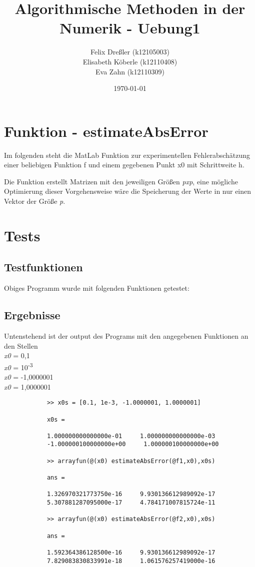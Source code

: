 \documentclass[11pt,titlepage]{article}
\title{Algorithmische Methoden in der Numerik - Uebung1}
\author{Felix Dreßler (k12105003) \\ Elisabeth Köberle (k12110408) \\ Eva Zahn (k12110309)}
\date{\today} %
\begin{document}
\maketitle

\section{Funktion - estimateAbsError}

Im folgenden steht die MatLab Funktion zur experimentellen Fehlerabschätzung einer beliebigen Funktion f und einem gegebenen Punkt x0 mit Schrittweite h.

Die Funktion erstellt Matrizen mit den jeweiligen Größen \emph{pxp}, eine mögliche Optimierung dieser Vorgehensweise wäre die Speicherung der Werte in nur einen Vektor der Größe \emph{p}.   

	
		
\section{Tests}
	\subsection{Testfunktionen}
		Obiges Programm wurde mit folgenden Funktionen getestet:
		
		
	\subsection{Ergebnisse}
		Untenstehend ist der output des Programs mit den angegebenen Funktionen an den Stellen \\
		\emph{x0} = 0,1 \\
		\emph{x0} = 10\textsuperscript{-3} \\
		\emph{x0} = -1,0000001 \\
		\emph{x0} = 1,0000001
		
		\begin{lstlisting}
			>> x0s = [0.1, 1e-3, -1.0000001, 1.0000001]
			
			x0s =
			
			1.000000000000000e-01     1.000000000000000e-03    
			-1.000000100000000e+00     1.000000100000000e+00
			
			>> arrayfun(@(x0) estimateAbsError(@f1,x0),x0s)
			
			ans =
			
			1.326970321773750e-16     9.930136612989092e-17     
			5.307881287095000e-17     4.784171007815724e-11
			
			>> arrayfun(@(x0) estimateAbsError(@f2,x0),x0s)
			
			ans =
			
			1.592364386128500e-16     9.930136612989092e-17     
			7.829083830833991e-18     1.061576257419000e-16
		\end{lstlisting}
\end{document}
